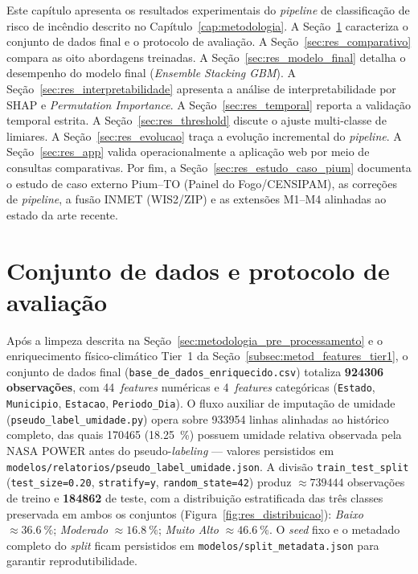 Este capítulo apresenta os resultados experimentais do \emph{pipeline} de classificação de risco de incêndio descrito no Capítulo~\ref{cap:metodologia}. A Seção~\ref{sec:res_dataset} caracteriza o conjunto de dados final e o protocolo de avaliação. A Seção~\ref{sec:res_comparativo} compara as oito abordagens treinadas. A Seção~\ref{sec:res_modelo_final} detalha o desempenho do modelo final (\emph{Ensemble Stacking GBM}). A Seção~\ref{sec:res_interpretabilidade} apresenta a análise de interpretabilidade por SHAP e \emph{Permutation Importance}. A Seção~\ref{sec:res_temporal} reporta a validação temporal estrita. A Seção~\ref{sec:res_threshold} discute o ajuste multi-classe de limiares. A Seção~\ref{sec:res_evolucao} traça a evolução incremental do \emph{pipeline}. A Seção~\ref{sec:res_app} valida operacionalmente a aplicação web por meio de consultas comparativas. Por fim, a Seção~\ref{sec:res_estudo_caso_pium} documenta o estudo de caso externo Pium--TO (Painel do Fogo/CENSIPAM), as correções de \emph{pipeline}, a fusão INMET (WIS2/ZIP) e as extensões M1--M4 alinhadas ao estado da arte recente.

\section{Conjunto de dados e protocolo de avaliação}
\label{sec:res_dataset}

Após a limpeza descrita na Seção~\ref{sec:metodologia_pre_processamento} e o enriquecimento físico-climático Tier~1 da Seção~\ref{subsec:metod_features_tier1}, o conjunto de dados final (\texttt{base\_de\_dados\_enriquecido.csv}) totaliza \textbf{\num{924306} observações}, com 44~\emph{features} numéricas e 4~\emph{features} categóricas (\texttt{Estado}, \texttt{Municipio}, \texttt{Estacao}, \texttt{Periodo\_Dia}). O fluxo auxiliar de imputação de umidade (\texttt{pseudo\_label\_umidade.py}) opera sobre \num{933954} linhas alinhadas ao histórico completo, das quais \num{170465} (\SI{18,25}{\percent}) possuem umidade relativa observada pela NASA POWER antes do pseudo-\emph{labeling} --- valores persistidos em \texttt{modelos/relatorios/pseudo\_label\_umidade.json}. A divisão \texttt{train\_test\_split} (\texttt{test\_size=0.20}, \texttt{stratify=y}, \texttt{random\_state=42}) produz \(\approx \num{739444}\) observações de treino e \textbf{\num{184862}} de teste, com a distribuição estratificada das três classes preservada em ambos os conjuntos (Figura~\ref{fig:res_distribuicao}): \emph{Baixo} \(\approx \SI{36,6}{\percent}\); \emph{Moderado} \(\approx \SI{16,8}{\percent}\); \emph{Muito Alto} \(\approx \SI{46,6}{\percent}\). O \emph{seed} fixo e o metadado completo do \emph{split} ficam persistidos em \texttt{modelos/split\_metadata.json} para garantir reprodutibilidade.

